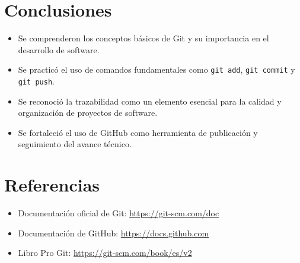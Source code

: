 \documentclass[12pt,a4paper]{article}
\begin{document}
\section{Conclusiones}

\begin{itemize}
    \item Se comprenderon los conceptos básicos de Git y su importancia en el desarrollo de software.
    \item Se practicó el uso de comandos fundamentales como \texttt{git add}, \texttt{git commit} y \texttt{git push}.
    \item Se reconoció la trazabilidad como un elemento esencial para la calidad y organización de proyectos de software.
    \item Se fortaleció el uso de GitHub como herramienta de publicación y seguimiento del avance técnico.
\end{itemize}

\section{Referencias}

\begin{itemize}
    \item Documentación oficial de Git: \url{https://git-scm.com/doc}
    \item Documentación de GitHub: \url{https://docs.github.com}
    \item Libro Pro Git: \url{https://git-scm.com/book/es/v2}
\end{itemize}
\end{document}
